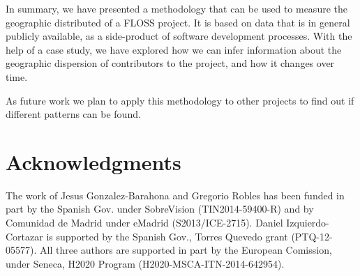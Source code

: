 \documentclass{sig-alternate-05-2015}
\begin{document}
In summary, we have presented a methodology that can be used to measure
the geographic distributed of a FLOSS project. It is based on data that
is in general publicly available, as a side-product of software development processes. With the help of a case study, we have explored how we can infer 
information about the geographic dispersion of contributors to the project,
and how it changes over time.

As future work we plan to apply this methodology to other projects to find
out if different patterns can be found.

\section*{Acknowledgments}

The work of Jesus Gonzalez-Barahona and Gregorio Robles has been funded in part by the Spanish Gov. under SobreVision (TIN2014-59400-R) and by Comunidad de Madrid under eMadrid (S2013/ICE-2715). Daniel Izquierdo-Cortazar is supported by the Spanish Gov., Torres Quevedo grant (PTQ-12-05577). All three authors are supported in part by the European Comission, under Seneca, H2020 Program (H2020-MSCA-ITN-2014-642954).



%

%
%
\end{document}
